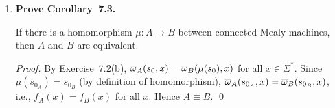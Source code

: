 \begin{enumerate}[{7.}1.]
\begin{enumerate}[(a)]
  \item \textbf{Prove $\mu(\DBAR_A(s,x))=\DBAR_B(\mu(s),x)$.}

  \begin{proof}
  By induction on $|x|$.

  \emph{Base:} $\mu(\DBAR_A(s,\lambda))=\mu(s)=\DBAR_B(\mu(s),\lambda)$.

  \emph{Step:}  Let $x=\pmb{a}y$ with $|y|=k$.  Then
  \[
  \begin{aligned}
  \mu(\DBAR_A(s,\pmb{a}y))
  &=\mu(\DBAR_A(\delta_A(s,\pmb{a}),y))\\
  &=\DBAR_B(\mu(\delta_A(s,\pmb{a})),y)\\
  &=\DBAR_B(\delta_B(\mu(s),\pmb{a}),y)\\
  &=\DBAR_B(\mu(s),\pmb{a}y).
  \end{aligned}
  \]
  Thus $\mu(\DBAR_A(s,x))=\DBAR_B(\mu(s),x)$. \qed
  \end{proof}

  \item \textbf{Prove $\OBAR_A(s,x)=\OBAR_B(\mu(s),x)$.}

  \begin{proof}
  By induction on $|x|$.

  \emph{Base:} $\OBAR_A(s,\lambda)=\lambda=\OBAR_B(\mu(s),\lambda)$.

  \emph{Step:}  Let $x=\pmb{a}y$ with $|y|=k$.  Then
  \[
  \begin{aligned}
  \OBAR_A(s,\pmb{a}y)
  &=\omega_A(s,\pmb{a})\cdot\OBAR_A(\delta_A(s,\pmb{a}),y)\\
  &=\omega_B(\mu(s),\pmb{a})\cdot
    \OBAR_B(\mu(\delta_A(s,\pmb{a})),y)\\
  &=\omega_B(\mu(s),\pmb{a})\cdot
    \OBAR_B(\delta_B(\mu(s),\pmb{a}),y)\\
  &=\OBAR_B(\mu(s),\pmb{a}y).
  \end{aligned}
  \]
  Thus $\OBAR_A(s,x)=\OBAR_B(\mu(s),x)$. \qed
  \end{proof}
\end{enumerate}

\item \textbf{Prove Corollary~7.3.}

If there is a homomorphism $\mu:A\to B$ between connected Mealy machines, then
$A$ and $B$ are equivalent.

\begin{proof}
By Exercise~7.2(b), $\overline{\omega}_A(s_0,x)=\overline{\omega}_B(\mu(s_0),x)$ for all $x\in\Sigma^*$.  Since $\mu(s_{0_A})=s_{0_B}$ (by definition of homomorphism), $\overline{\omega}_A(s_{0_A},x)=\overline{\omega}_B(s_{0_B},x)$, i.e., $f_A(x)=f_B(x)$ for all $x$.  Hence $A\equiv B$. \qed
\end{proof}


\end{enumerate}
